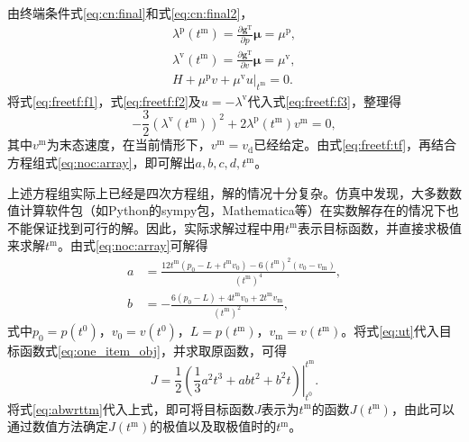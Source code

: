 由终端条件式\eqref{eq:cn:final}和式\eqref{eq:cn:final2}，
\begin{align}
\lambda^\mathrm{p}(t^\mathrm{m})=\frac{\partial \bm{g}^\mathrm{T}}{\partial p}\bm{\mu}=\mu^\mathrm{p},\label{eq:freetf:f1}\\
\lambda^\mathrm{v}(t^\mathrm{m})=\frac{\partial \bm{g}^\mathrm{T}}{\partial v}\bm{\mu}=\mu^\mathrm{v},\label{eq:freetf:f2}\\
\left. H+\mu^\mathrm{p}v+\mu^\mathrm{v}u\right|_{t^\mathrm{m}}=0.\label{eq:freetf:f3}
\end{align}
将式\eqref{eq:freetf:f1}，式\eqref{eq:freetf:f2}及$u=-\lambda^\mathrm{v}$代入式\eqref{eq:freetf:f3}，整理得
\begin{equation}
-\frac32(\lambda^\mathrm{v}(t^\mathrm{m}))^2+2\lambda^\mathrm{p}(t^\mathrm{m})v^\mathrm{m}=0,
\label{eq:freetf:tf}
\end{equation}
其中$v^\mathrm{m}$为末态速度，在当前情形下，$v^\mathrm{m}=v_\mathrm{d}$已经给定。由式\eqref{eq:freetf:tf}，再结合方程组式\eqref{eq:noc:array}，即可解出$a,b,c,d,t^\mathrm{m}$。

上述方程组实际上已经是四次方程组，解的情况十分复杂。仿真中发现，大多数数值计算软件包（如{\ttfamily Python}的{\ttfamily sympy}包，{\ttfamily Mathematica}等）在实数解存在的情况下也不能保证找到可行的解。因此，实际求解过程中用$t^\mathrm{m}$表示目标函数，并直接求极值来求解$t^\mathrm{m}$。由式\eqref{eq:noc:array}可解得
\begin{equation}
\begin{aligned}
a &= \frac{12t^\mathrm{m} (p_0 - L + t^\mathrm{m}v_0) - 6(t^\mathrm{m})^2(v_0 - v_\mathrm{m})}{(t^\mathrm{m})^4},\\
b &= -\frac{6(p_0 - L) + 4t^\mathrm{m}v_0 + 2t^\mathrm{m}v_\mathrm{m}}{(t^\mathrm{m})^2},
\end{aligned}
\label{eq:abwrttm}
\end{equation}
式中$p_0=p(t^0)$，$v_0=v(t^0)$，$L=p(t^\mathrm{m})$，$v_\mathrm{m}=v(t^\mathrm{m})$。将式\eqref{eq:ut}代入目标函数式\eqref{eq:one_item_obj}，并求取原函数，可得
\begin{equation}
J=\left.\frac12(\frac13a^2t^3+abt^2+b^2t)\right|^{t^\mathrm{m}}_{t^0}.
\label{eq:tmopt}
\end{equation}
将式\eqref{eq:abwrttm}代入上式，即可将目标函数$J$表示为$t^\mathrm{m}$的函数$J(t^\mathrm{m})$，由此可以通过数值方法确定$J(t^\mathrm{m})$的极值以及取极值时的$t^\mathrm{m}$。

